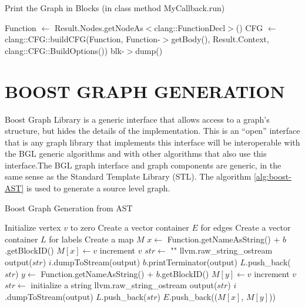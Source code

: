 \begin{algorithm}
\caption{Print the Graph in Blocks (in class method MyCallback.run)}\label{alg:cap}
\begin{algorithmic}[1]
\State Function $\leftarrow$ Result.Nodes.getNodeAs$<$clang::FunctionDecl$>$()
\State CFG $\leftarrow$ clang::CFG::buildCFG(Function, Function-$>$getBody(), Result.Context, clang::CFG::BuildOptions())
   \State blk-$>$dump()
\EndFor
\end{algorithmic}
\end{algorithm}

\section{\uppercase{Boost Graph Generation}}
Boost Graph Library is a generic interface that allows access to a graph's structure, but hides the details of the implementation. This is an “open” interface that is any graph library that implements this interface will be interoperable with the BGL generic algorithms and with other algorithms that also use this interface.The BGL graph interface and graph components are generic, in the same sense as the Standard Template Library (STL). The algorithm \ref{alg:boost-AST} is used to generate a source level graph.
\begin{algorithm}
\caption{Boost Graph Generation from AST}\label{alg:boost-AST}
\begin{algorithmic}[1]
\State Initialize vertex $v$ to zero
\State Create a vector container $E$ for edges
\State Create a vector container $L$ for labels
\State Create a map $M$
    \State $x \gets$ Function.getNameAsString() + $b$.getBlockID()
        \State $M[x] \gets v$
        \State increment $v$
        \State $str \gets$ ""
        \State llvm.raw\_string\_ostream output($str$)
            \State $i$.dumpToStream(output)
                \State $b$.printTerminator(output)
            \EndIf
            \State $L$.push\_back($str$)
        \EndFor
            \State $y \gets$ Function.getNameAsString() + $b$.getBlockID()
                \State $M[y] \gets v$
                \State increment $v$
                \State $str \gets$ initialize a string
                \State llvm.raw\_string\_ostream output($str$)
                    \State $i$.dumpToStream(output)
                    \State $L$.push\_back($str$)
                \EndFor
            \EndIf
            \State $E$.push\_back(($M[x]$, $M[y]$))
        \EndFor
    \EndIf
\EndFor
\end{algorithmic}
\end{algorithm}

